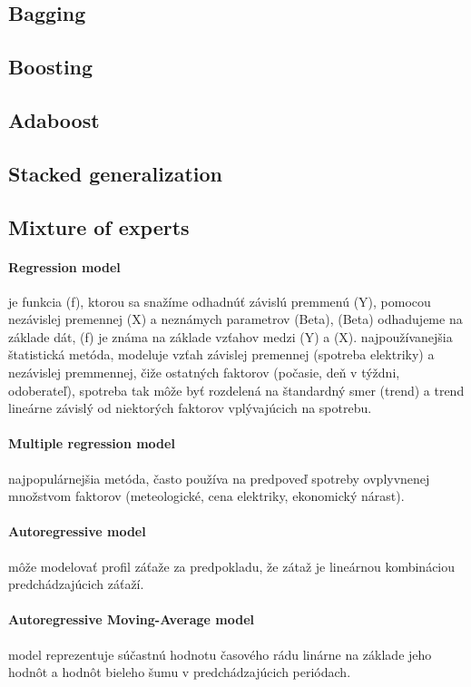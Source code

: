 \documentclass[12pt,oneside,slovak,a4paper]{book}
\begin{document}
\subsection{Bagging}
\subsection{Boosting}
\subsection{Adaboost}
\subsection{Stacked generalization}
\subsection{Mixture of experts}

\paragraph{Regression model}
je funkcia (f), ktorou sa snažíme odhadnúť závislú premmenú (Y), pomocou
nezávislej premennej (X) a neznámych parametrov (Beta), (Beta) odhadujeme na
základe dát, (f) je známa na základe vzťahov medzi (Y) a (X)\cite{Grmanova2016}.
najpoužívanejšia štatistická metóda, modeluje vzťah závislej premennej
(spotreba elektriky) a nezávislej premmennej, čiže ostatných faktorov
(počasie, deň v týždni, odoberateľ), spotreba tak môže byť rozdelená na
štandardný smer (trend) a trend lineárne závislý od niektorých faktorov
vplývajúcich na spotrebu\cite{KumarSingh2013}.

\paragraph{Multiple regression model}
najpopulárnejšia metóda, často používa na predpoveď spotreby ovplyvnenej
množstvom faktorov (meteologické, cena elektriky, ekonomický
nárast)\cite{KumarSingh2013}.

\paragraph{Autoregressive model}
môže modelovať profil záťaže za predpokladu, že zátaž je lineárnou kombináciou
predchádzajúcich záťaží\cite{KumarSingh2013}.

\paragraph{Autoregressive Moving-Average model}
model reprezentuje súčastnú hodnotu časového rádu linárne na základe jeho hodnôt
a hodnôt bieleho šumu v predchádzajúcich periódach\cite{KumarSingh2013}.
\end{document}
